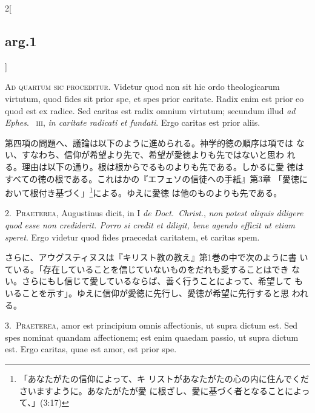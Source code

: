 \documentclass[paper=a4paper,fontsize=10pt,jafontsize=9pt,titlepage]{jlreq}
\begin{document}
\begin{paracol}{2}[\subsection{arg.1}]

{\scshape Ad quartum sic proceditur}. Videtur quod non sit hic ordo
theologicarum virtutum, quod fides sit prior spe, et spes prior
caritate. Radix enim est prior eo quod est ex radice. Sed caritas est
radix omnium virtutum; secundum illud {\itshape ad Ephes}.~{\scshape
iii}, {\itshape in caritate radicati et fundati}. Ergo caritas est
prior aliis.

\switchcolumn

第四項の問題へ、議論は以下のように進められる。神学的徳の順序は項では
 ない、すなわち、信仰が希望より先で、希望が愛徳よりも先ではないと思わ
 れる。理由は以下の通り。根は根からでるものよりも先である。しかるに愛
 徳はすべての徳の根である。これはかの『エフェソの信徒への手紙』第3章
 「愛徳において根付き基づく」\footnote{「あなたがたの信仰によって、キ
 リストがあなたがたの心の内に住んでくださいますように。あなたがたが愛
 に根ざし、愛に基づく者となることによって、」(3:17)}による。ゆえに愛徳
 は他のものよりも先である。


2.~{\scshape Praeterea}, Augustinus dicit, in I {\itshape de
Doct.~Christ}., {\itshape non potest aliquis diligere quod esse non
crediderit. Porro si credit et diligit, bene agendo efficit ut etiam
speret}. Ergo videtur quod fides praecedat caritatem, et caritas spem.

\switchcolumn

さらに、アウグスティヌスは『キリスト教の教え』第1巻の中で次のように書
いている。「存在していることを信じていないものをだれも愛することはでき
ない。さらにもし信じて愛しているならば、善く行うことによって、希望して
もいることを示す」。ゆえに信仰が愛徳に先行し、愛徳が希望に先行すると思
われる。


3.~{\scshape Praeterea}, amor est principium omnis affectionis, ut
supra dictum est. Sed spes nominat quandam affectionem; est enim
quaedam passio, ut supra dictum est. Ergo caritas, quae est amor, est
prior spe.


\end{paracol}
\end{document}
